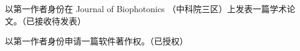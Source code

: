 \begin{resume}
  \thispagestyle{emptypage}

  \begin{enumerate}[label={[\arabic*]}]
  \addtolength{\itemsep}{0\baselineskip}%
  \item 以第一作者身份在 Journal of Biophotonics （中科院三区）上发表一篇学术论文。（已接收待发表）
  \item 以第一作者身份申请一篇软件著作权。（已授权）
\end{enumerate}
\end{resume}